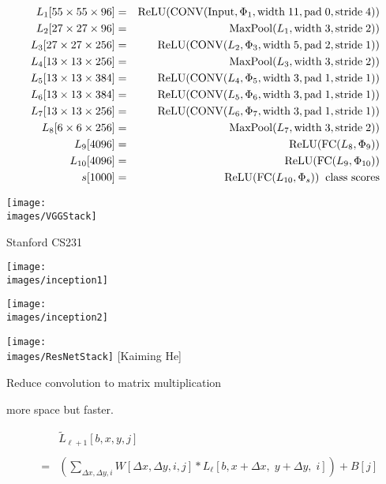 {{\begin{eqnarray*}
L_1[55 \times 55 \times 96] & = & \mathrm{ReLU}(\mathrm{CONV}(\mathrm{Input},\Phi_1,\mathrm{width}\;11,\mathrm{pad}\;0,\mathrm{stride}\;4)) \\
L_2[27 \times 27 \times 96] & = & \mathrm{MaxPool}(L_1,\mathrm{width}\;3,\mathrm{stride}\;2))  \\
L_3[27 \times 27 \times 256] & = & \mathrm{ReLU}(\mathrm{CONV}(L_2,\Phi_3,\mathrm{width}\;5,\mathrm{pad}\;2,\mathrm{stride}\;1))  \\
L_4[13 \times 13 \times 256] & = & \mathrm{MaxPool}(L_3,\mathrm{width}\;3,\mathrm{stride}\;2))  \\
L_5[13 \times 13 \times 384] & = & \mathrm{ReLU}(\mathrm{CONV}(L_4,\Phi_5,\mathrm{width}\;3,\mathrm{pad}\;1,\mathrm{stride}\;1))  \\
L_6[13 \times 13 \times 384] & = & \mathrm{ReLU}(\mathrm{CONV}(L_5,\Phi_6,\mathrm{width}\;3,\mathrm{pad}\;1,\mathrm{stride}\;1))  \\
L_7[13 \times 13 \times 256] & = & \mathrm{ReLU}(\mathrm{CONV}(L_6,\Phi_7,\mathrm{width}\;3,\mathrm{pad}\;1,\mathrm{stride}\;1))  \\
L_8[6 \times 6 \times 256] & = & \mathrm{MaxPool}(L_7,\mathrm{width}\;3,\mathrm{stride}\;2)) \\
L_9[4096] & = & \mathrm{ReLU}(\mathrm{FC}(L_8,\Phi_9)) \\
L_{10}[4096] & = & \mathrm{ReLU}(\mathrm{FC}(L_9,\Phi_{10})) \\
s[1000] & = & \mathrm{ReLU}(\mathrm{FC}(L_{10},\Phi_s)) \;\;\mbox{class scores}
\end{eqnarray*}
}

\centerline{\texttt{[image: \\images/VGGStack]}}
\centerline{\large Stanford CS231}


\centerline{\texttt{[image: \\images/inception1]}}
\vfill
\centerline{\texttt{[image: \\images/inception2]}}

\centerline{\texttt{[image: \\images/ResNetStack]} {\large [Kaiming He]}}



Reduce convolution to matrix multiplication

\vfill
more space but faster.

\vfill
\begin{eqnarray*}
  & & \tilde{L}_{{\ell+1}}[b,x,y,j] \\
  \\
  & = & \left(\sum_{\Delta x, \Delta y, i} W[\Delta x, \Delta y, i, j] *L_{{\ell}}[b,x + \Delta x,\; y + \Delta y,\; i]\right) + B[j]
  \end{eqnarray*}

}
